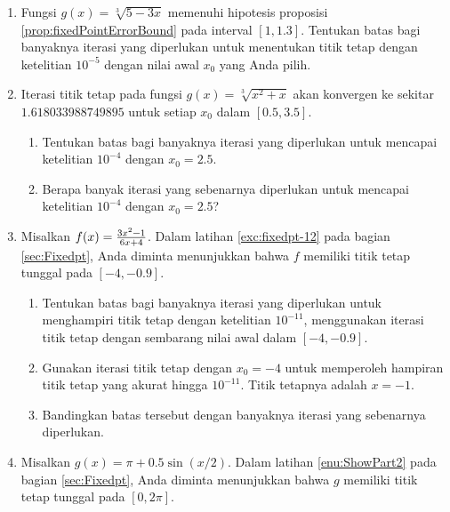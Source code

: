 \begin{enumerate}
\begin{enumerate}
\item $7,8,9,10,11,12,13,14,15$
\item \label{exc:orderOfConvergence-1}$20,19,18,17,16,15,14,13$ 
\item $12,12.333,12.667,13,13.333,13.667,14$
\item $1,9,25,49,81,121,169,225,289,361,441$
\item $1,.5,.25,.125,.0625,.03125,.015625$
\end{enumerate}
\item Fungsi $g(x)=\sqrt[3]{5-3x}$ memenuhi hipotesis proposisi \ref{prop:fixedPointErrorBound}
pada interval $[1,1.3]$. Tentukan batas bagi banyaknya iterasi yang
diperlukan untuk menentukan titik tetap dengan ketelitian $10^{-5}$
dengan nilai awal $x_{0}$ yang Anda pilih.
\item \label{exc:orderOfConvergence-2}Iterasi titik tetap pada fungsi $g(x)=\sqrt[3]{x^{2}+x}$
akan konvergen ke sekitar $1.618033988749895$ untuk setiap $x_{0}$
dalam $[0.5,3.5]$. \hasananswer 

\begin{enumerate}
\item Tentukan batas bagi banyaknya iterasi yang diperlukan untuk mencapai
ketelitian $10^{-4}$ dengan $x_{0}=2.5.$
\item Berapa banyak iterasi yang sebenarnya diperlukan untuk mencapai ketelitian
$10^{-4}$ dengan $x_{0}=2.5$?
\end{enumerate}
\item \label{exc:orderOfConvergence-3}Misalkan $f(x)=\frac{3x^{2}\text{\textminus}1}{6x+4}$.
Dalam latihan \ref{exc:fixedpt-12} pada bagian \ref{sec:Fixedpt},
Anda diminta menunjukkan bahwa $f$ memiliki titik tetap tunggal pada
$[-4,-0.9]$. \hasasolution 

\begin{enumerate}
\item Tentukan batas bagi banyaknya iterasi yang diperlukan untuk menghampiri
titik tetap dengan ketelitian $10^{-11}$, menggunakan iterasi titik
tetap dengan sembarang nilai awal dalam $[-4,-0.9]$. 
\item Gunakan iterasi titik tetap dengan $x_{0}=-4$ untuk memperoleh hampiran
titik tetap yang akurat hingga $10^{-11}$. Titik tetapnya adalah
$x=-1$.
\item Bandingkan batas tersebut dengan banyaknya iterasi yang sebenarnya
diperlukan.
\end{enumerate}
\item Misalkan $g(x)=\pi+0.5\sin(x/2)$. Dalam latihan \ref{enu:ShowPart2}
pada bagian \ref{sec:Fixedpt}, Anda diminta menunjukkan bahwa $g$
memiliki titik tetap tunggal pada $[0,2\pi]$.


\end{enumerate}
